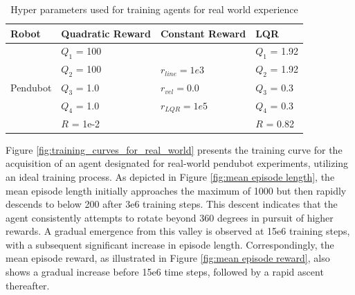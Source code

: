 \begin{table}[H]
  \centering
  \begin{tabular}{p{2cm} | p{3cm} | p{3cm} | p{3cm}}
  Robot & Quadratic Reward  & Constant Reward & LQR\\
  \hline
  \multirow{5}{*}{Pendubot} & \(Q_1\) = 100 &  & \(Q_1\) = 1.92\\
  & \(Q_2\) = 100  & \(r_{line}=1e3\) & \(Q_2\) = 1.92\\
  & \(Q_3\) = 1.0  & \(r_{vel}=0.0\) & \(Q_3\) = 0.3\\
  & \(Q_4\) = 1.0  & \(r_{LQR}=1e5\)& \(Q_4\) = 0.3\\
  & \(R\) = 1e-2  & & \(R\) = 0.82\\
  \end{tabular}
 \caption{Hyper parameters used for training agents for real world experience}
 \label{tab:training_parameters_real_world}
\end{table}

Figure \ref{fig:training_curves_for_real_world} presents the training curve for the acquisition of an agent designated for real-world pendubot experiments, utilizing an ideal training process. As depicted in Figure \ref{fig:mean episode length}, the mean episode length initially approaches the maximum of 1000 but then rapidly descends to below 200 after 3e6 training steps. This descent indicates that the agent consistently attempts to rotate beyond 360 degrees in pursuit of higher rewards. A gradual emergence from this valley is observed at 15e6 training steps, with a subsequent significant increase in episode length. Correspondingly, the mean episode reward, as illustrated in Figure \ref{fig:mean episode reward}, also shows a gradual increase before 15e6 time steps, followed by a rapid ascent thereafter.


